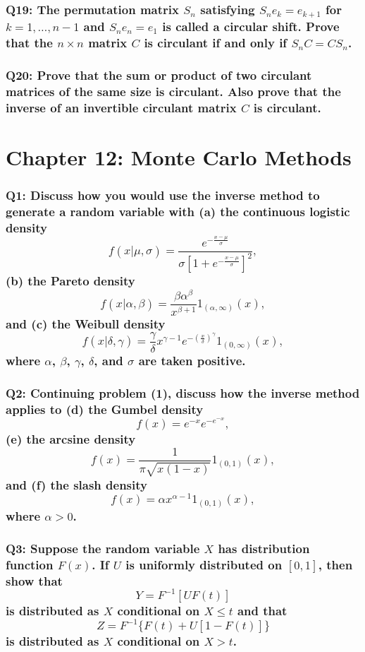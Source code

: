 \documentclass[8pt]{article}
\begin{document}
\subsubsection*{Q19:
The permutation matrix \(S_n\) satisfying \(S_n e_k = e_{k+1}\) for \(k = 1, \ldots, n-1\) and \(S_n e_n = e_1\) is called a circular shift. Prove that the \(n \times n\) matrix \(C\) is circulant if and only if \(S_n C = C S_n\).}

\subsubsection*{Q20:
Prove that the sum or product of two circulant matrices of the same size is circulant. Also prove that the inverse of an invertible circulant matrix \(C\) is circulant.}


\newpage
\section*{Chapter 12: Monte Carlo Methods}

\subsubsection*{Q1:
Discuss how you would use the inverse method to generate a random variable with (a) the continuous logistic density
\[
f(x|\mu, \sigma) = \frac{e^{-\frac{x-\mu}{\sigma}}}{\sigma [1 + e^{-\frac{x-\mu}{\sigma}}]^2},
\]
(b) the Pareto density
\[
f(x|\alpha, \beta) = \frac{\beta \alpha^\beta}{x^{\beta+1}} 1_{(\alpha, \infty)}(x),
\]
and (c) the Weibull density
\[
f(x|\delta, \gamma) = \frac{\gamma}{\delta} x^{\gamma-1} e^{-\left(\frac{x}{\delta}\right)^\gamma} 1_{(0, \infty)}(x),
\]
where \(\alpha\), \(\beta\), \(\gamma\), \(\delta\), and \(\sigma\) are taken positive.}

\subsubsection*{Q2:
Continuing problem (1), discuss how the inverse method applies to (d) the Gumbel density
\[
f(x) = e^{-x} e^{-e^{-x}},
\]
(e) the arcsine density
\[
f(x) = \frac{1}{\pi \sqrt{x(1-x)}} 1_{(0,1)}(x),
\]
and (f) the slash density
\[
f(x) = \alpha x^{\alpha-1} 1_{(0,1)}(x),
\]
where \(\alpha > 0\).}

\subsubsection*{Q3:
Suppose the random variable \(X\) has distribution function \(F(x)\). If \(U\) is uniformly distributed on \([0, 1]\), then show that
\[
Y = F^{-1}[UF(t)]
\]
is distributed as \(X\) conditional on \(X \leq t\) and that
\[
Z = F^{-1}\{F(t) + U[1 - F(t)]\}
\]
is distributed as \(X\) conditional on \(X > t\).}
\end{document}
